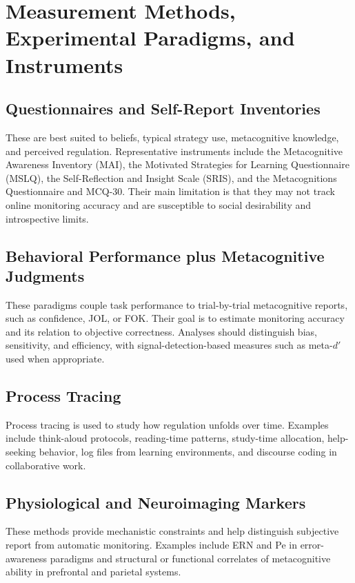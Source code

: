 \documentclass[a4paper]{article}
\begin{document}
   \section{Measurement Methods, Experimental Paradigms, and Instruments}

   \subsection{Questionnaires and Self-Report Inventories}

   These are best suited to beliefs, typical strategy use, metacognitive knowledge, and perceived regulation. Representative instruments include the Metacognitive Awareness Inventory (MAI), the Motivated Strategies for Learning Questionnaire (MSLQ), the Self-Reflection and Insight Scale (SRIS), and the Metacognitions Questionnaire and MCQ-30. Their main limitation is that they may not track online monitoring accuracy and are susceptible to social desirability and introspective limits.

   \subsection{Behavioral Performance plus Metacognitive Judgments}

   These paradigms couple task performance to trial-by-trial metacognitive reports, such as confidence, JOL, or FOK. Their goal is to estimate monitoring accuracy and its relation to objective correctness. Analyses should distinguish bias, sensitivity, and efficiency, with signal-detection-based measures such as meta-$d'$ used when appropriate.

   \subsection{Process Tracing}

   Process tracing is used to study how regulation unfolds over time. Examples include think-aloud protocols, reading-time patterns, study-time allocation, help-seeking behavior, log files from learning environments, and discourse coding in collaborative work.

   \subsection{Physiological and Neuroimaging Markers}

   These methods provide mechanistic constraints and help distinguish subjective report from automatic monitoring. Examples include ERN and Pe in error-awareness paradigms and structural or functional correlates of metacognitive ability in prefrontal and parietal systems.
\end{document}
